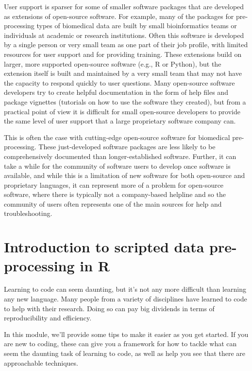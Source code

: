 \documentclass[]{tufte-book}
\begin{document}
User support is sparser for some of smaller software packages that are developed
as extensions of open-source software. For example, many of the packages for
pre-processing types of biomedical data are built by small bioinformatics teams
or individuals at academic or research institutions. Often this software is
developed by a single person or very small team as one part of their job
profile, with limited resources for user support and for providing training.
These extensions build on larger, more supported open-source software (e.g., R
or Python), but the extension itself is built and maintained by a very small
team that may not have the capacity to respond quickly to user questions. Many
open-source software developers try to create helpful documentation in the form
of help files and package vignettes (tutorials on how to use the software they
created), but from a practical point of view it is difficult for small
open-source developers to provide the same level of user support that a large
proprietary software company can.

This is often the case with cutting-edge open-source software for biomedical
pre-processing. These just-developed software packages are less likely to be
comprehensively documented than longer-established software. Further, it can
take a while for the community of software users to develop once software is
available, and while this is a limitation of new software for both open-source
and proprietary languages, it can represent more of a problem for open-source
software, where there is typically not a company-based helpline and so the
community of users often represents one of the main sources for help and
troubleshooting.

\section{Introduction to scripted data pre-processing in R}\label{module13}

Learning to code can seem daunting, but it's not any more difficult than
learning any new language. Many people from a variety of disciplines have
learned to code to help with their research. Doing so can pay big dividends in
terms of reproducibility and efficiency.

In this module, we'll provide some tips to make it easier as you get started.
If you are new to coding, these can give you a framework for how to tackle what
can seem the daunting task of learning to code, as well as help you see that
there are approachable techniques.
\end{document}
